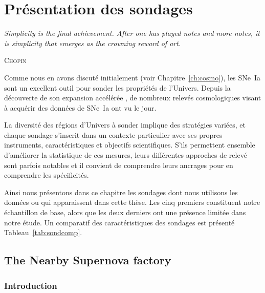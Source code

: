 \documentclass[../main/main.tex]{subfiles}
\begin{document}

\chapter{Pr\'esentation des sondages}\label{ch:surveys}
\epigraph{\openquote\textit{Simplicity is the final achievement. After one has
        played notes and more notes, it is simplicity that emerges as the
crowning reward of art.}\closequote}{\textsc{Chopin}}

\vfill
Comme nous en avons discuté initialement (voir Chapitre~\ref{ch:cosmo}), les
SNe~Ia sont un excellent outil pour sonder les propriétés de l'Univers. Depuis
la découverte de son expansion accélérée \citep{riess1998, perlmutter1999}, de
nombreux relevés cosmologiques visant à acquérir des données de SNe~Ia ont vu le
jour.

La diversité des régions d'Univers à sonder implique des stratégies variées, et
chaque sondage s'inscrit dans un contexte particulier avec ses propres
instruments, caractéristiques et objectifs scientifiques. S'ils permettent
ensemble d'améliorer la statistique de ces mesures, leurs différentes approches
de relevé sont parfois notables et il convient de comprendre leurs ancrages pour
en comprendre les spécificités.

Ainsi nous présentons dans ce chapitre les sondages dont nous utilisons les
données ou qui apparaissent dans cette thèse. Les cinq premiers constituent
notre échantillon de base, alors que les deux derniers ont une présence limitée
dans notre étude. Un comparatif des caractéristiques des sondages est présenté
Tableau~\ref{tab:sondcomp}.

\vfill

\newpage
\vfill
\minitoc
\vfill
\newpage

\section{The Nearby Supernova factory}\label{sec:snf}
\subsection{Introduction}\label{ssec:snfintro}
\end{document}
